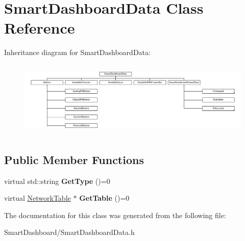 \hypertarget{classSmartDashboardData}{
\section{SmartDashboardData Class Reference}
\label{classSmartDashboardData}
}
Inheritance diagram for SmartDashboardData:\begin{figure}[H]
\begin{center}
\leavevmode
\includegraphics[height=3.649907cm]{classSmartDashboardData}
\end{center}
\end{figure}
\subsection*{Public Member Functions}
\begin{DoxyCompactItemize}
\item 
\hypertarget{classSmartDashboardData_a4ecfdbcd273a5b7558fdd073f9e1986f}{
virtual std::string {\bfseries GetType} ()=0}
\label{classSmartDashboardData_a4ecfdbcd273a5b7558fdd073f9e1986f}

\item 
\hypertarget{classSmartDashboardData_a88bac6c80fae389486a7dfe218369fdb}{
virtual \hyperlink{classNetworkTable}{NetworkTable} $\ast$ {\bfseries GetTable} ()=0}
\label{classSmartDashboardData_a88bac6c80fae389486a7dfe218369fdb}

\end{DoxyCompactItemize}


The documentation for this class was generated from the following file:\begin{DoxyCompactItemize}
\item 
SmartDashboard/SmartDashboardData.h\end{DoxyCompactItemize}
